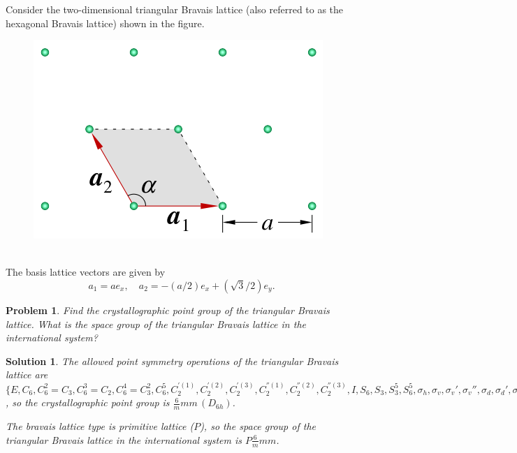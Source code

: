 \documentclass[UTF8,10pt,a4paper]{article}
\theoremstyle{Problem}
\newtheorem{prob}{Problem}
\theoremstyle{Solution}
\newtheorem*{sol}{Solution}
\begin{document}
\thispagestyle{FirstPageStyle}
Consider the two-dimensional triangular Bravais lattice (also referred to as the hexagonal Bravais lattice) shown in the figure.
\begin{figure}[h]
    \centering
    \includegraphics[width=.2\textwidth]{HexagonalBravaisLattice.png}
\end{figure}
\\The basis lattice vectors are given by
\[
    a_1=ae_x,\quad a_2=-(a/2)e_x+(\sqrt{3}/2)e_y.
\]

\begin{prob}
    Find the crystallographic point group of the triangular Bravais lattice. What is the space group of the triangular Bravais lattice in the international system?
\end{prob}
\begin{sol}
    The allowed point symmetry operations of the triangular Bravais lattice are $\{E,C_6,C_6^2=C_3,C_6^3=C_2,C_6^4=C_3^2,C_6^5,C_2^{'(1)},C_2^{'(2)},C_2^{'(3)},C_2^{''(1)},C_2^{''(2)},C_2^{''(3)},I,S_6,S_3,S_3^5,S_6^5,\sigma_h,\sigma_v,\sigma_v',\sigma_v'',\sigma_d,\sigma_d',\sigma_d''\}$, so the crystallographic point group is $\frac{6}{m}mm\,(D_{6h})$.

    The bravais lattice type is primitive lattice ($P$), so the space group of the triangular Bravais lattice in the international system is $P\frac{6}{m}mm$.
\end{sol}
\end{document}
